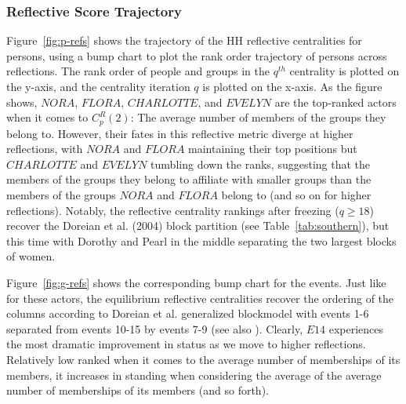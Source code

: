 \documentclass[a4paper,fleqn]{cas-sc}
\begin{document}
\subsubsection{Reflective Score Trajectory}

Figure~\ref{fig:p-refs} shows the trajectory of the HH reflective centralities for persons, using a bump chart to plot the rank order trajectory of persons across reflections. The rank order of people and groups in the $q^{th}$ centrality is plotted on the y-axis, and the centrality iteration $q$ is plotted on the x-axis. As the figure shows, $NORA$, $FLORA$, $CHARLOTTE$, and $EVELYN$ are the top-ranked actors when it comes to $C^R_p(2)$:  The average number of members of the groups they belong to. However, their fates in this reflective metric diverge at higher reflections, with $NORA$ and $FLORA$ maintaining their top positions but $CHARLOTTE$ and $EVELYN$ tumbling down the ranks, suggesting that the members of the groups they belong to affiliate with smaller groups than the members of the groups $NORA$ and $FLORA$ belong to (and so on for higher reflections). Notably, the reflective centrality rankings after freezing ($q \geq 18$) recover the Doreian et al. (2004) block partition (see Table~\ref{tab:southern}), but this time with Dorothy and Pearl in the middle separating the two largest blocks of women. 

Figure~\ref{fig:g-refs} shows the corresponding bump chart for the events. Just like for these actors, the equilibrium reflective centralities recover the ordering of the columns according to Doreian et al. generalized blockmodel with events 1-6 separated from events 10-15 by events 7-9 (see also \citet{kovacs2010generalized}). Clearly, $E14$ experiences the most dramatic improvement in status as we move to higher reflections. Relatively low ranked when it comes to the average number of memberships of its members, it increases in standing when considering the average of the average number of memberships of its members (and so forth). 
\end{document}
